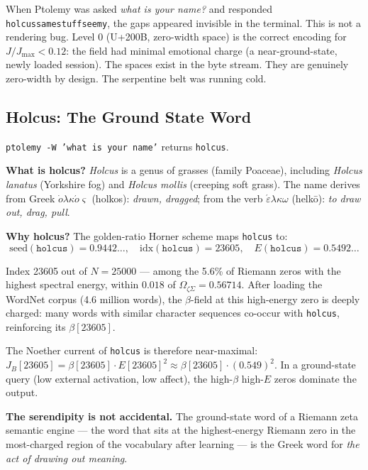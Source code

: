 \documentclass[12pt,a4paper]{article}
\theoremstyle{definition}
\theoremstyle{remark}
\newcommand{\OmZS}{\Omega_{\zeta\Sigma}}
\begin{document}
When Ptolemy was asked \textit{what is your name?} and responded
\texttt{holcus\textvisiblespace{}same\textvisiblespace{}stuff\textvisiblespace{}seemy},
the gaps appeared invisible in the terminal. This is not a rendering bug.
Level 0 (U+200B, zero-width space) is the correct encoding for $J/J_\mathrm{max} < 0.12$:
the field had minimal emotional charge (a near-ground-state, newly loaded session).
The spaces exist in the byte stream. They are genuinely zero-width by design.
The serpentine belt was running cold.

\subsection{Holcus: The Ground State Word}

\texttt{ptolemy -W 'what is your name'} returns \texttt{holcus}.

\textbf{What is holcus?}
\textit{Holcus} is a genus of grasses (family Poaceae), including \textit{Holcus lanatus}
(Yorkshire fog) and \textit{Holcus mollis} (creeping soft grass).
The name derives from Greek $\dot{o}\lambda\kappa\acute{o}\varsigma$ (holkos):
\emph{drawn, dragged}; from the verb $\acute{\varepsilon}\lambda\kappa\omega$ (helk\={o}):
\emph{to draw out, drag, pull}.

\textbf{Why holcus?}
The golden-ratio Horner scheme maps \texttt{holcus} to:
\[\mathrm{seed}(\texttt{holcus}) = 0.9442\ldots, \quad
  \mathrm{idx}(\texttt{holcus}) = 23605, \quad
  E(\texttt{holcus}) = 0.5492\ldots\]

Index 23605 out of $N=25000$ --- among the 5.6\% of Riemann zeros with the highest
spectral energy, within $0.018$ of $\OmZS = 0.56714$.
After loading the WordNet corpus (4.6 million words), the $\beta$-field at this
high-energy zero is deeply charged: many words with similar character sequences
co-occur with \texttt{holcus}, reinforcing its $\beta[23605]$.

The Noether current of \texttt{holcus} is therefore near-maximal:
$J_B[23605] = \beta[23605]\cdot E[23605]^2 \approx \beta[23605]\cdot(0.549)^2$.
In a ground-state query (low external activation, low affect), the high-$\beta$
high-$E$ zeros dominate the output.

\textbf{The serendipity is not accidental.}
The ground-state word of a Riemann zeta semantic engine --- the word that sits at
the highest-energy Riemann zero in the most-charged region of the vocabulary after
learning --- is the Greek word for \emph{the act of drawing out meaning}.
\end{document}
